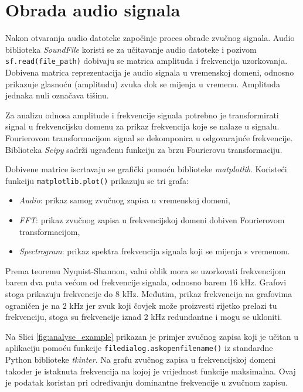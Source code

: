 \chapter{Obrada audio signala}

Nakon otvaranja audio datoteke započinje proces obrade zvučnog signala. Audio biblioteka \textit{SoundFile} koristi se za učitavanje audio datoteke i pozivom \lstinline|sf.read(file_path)| dobivaju se matrica amplituda i frekvencija uzorkovanja. Dobivena matrica reprezentacija je audio signala u vremenskoj domeni, odnosno prikazuje glasnoću (amplitudu) zvuka dok se mijenja u vremenu. Amplituda jednaka nuli označava tišinu.

Za analizu odnosa amplitude i frekvencije signala potrebno je transformirati signal u frekvencijsku domenu za prikaz frekvencija koje se nalaze u signalu. Fourierovom transformacijom signal se dekomponira u odgovarajuće frekvencije. Biblioteka \textit{Scipy} sadrži ugrađenu funkciju za brzu Fourierovu transformaciju. 

Dobivene matrice iscrtavaju se grafički pomoću biblioteke \textit{matplotlib}. Koristeći funkciju \lstinline|matplotlib.plot()| prikazuju se tri grafa:
\begin{itemize}
	\item \textit{Audio}: prikaz samog zvučnog zapisa u vremenskoj domeni,
	\item \textit{FFT}: prikaz zvučnog zapisa u frekvencijskoj domeni dobiven Fourierovom transformacijom,
	\item \textit{Spectrogram}: prikaz spektra frekvencija signala koji se mijenja s vremenom.
\end{itemize}

Prema teoremu Nyquist-Shannon, valni oblik mora se uzorkovati frekvencijom barem dva puta većom od frekvencije signala, odnosno barem 16 kHz. Grafovi stoga prikazuju frekvencije do 8 kHz. Međutim, prikaz frekvencija na grafovima ograničen je na 2 kHz jer zvuk koji čovjek može proizvesti rijetko prelazi tu frekvenciju, stoga su frekvencije iznad 2 kHz redundantne i mogu se ukloniti. 

Na Slici \ref{fig:analyse_example} prikazan je primjer zvučnog zapisa koji je učitan u aplikaciju pomoću funkcije \lstinline|filedialog.askopenfilename()| iz standardne Python biblioteke \textit{tkinter}. Na grafu zvučnog zapisa u frekvencijskoj domeni također je istaknuta frekvencija na kojoj je vrijednost funkcije maksimalna. Ovaj je podatak koristan pri određivanju dominantne frekvencije u zvučnom zapisu. 


